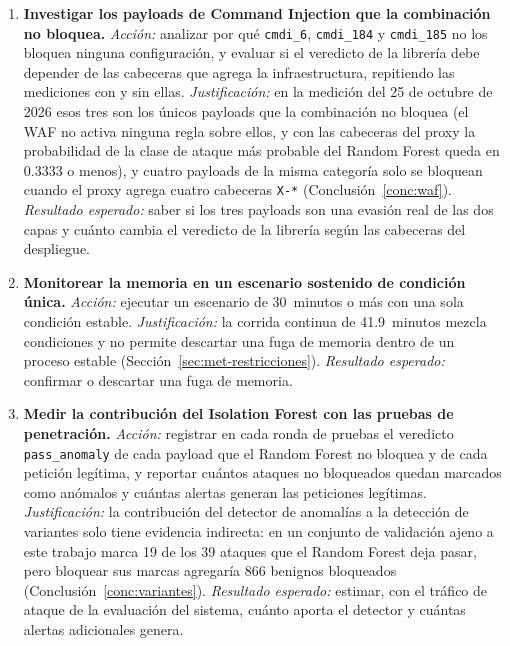 \begin{enumerate}
    \item \textbf{Investigar los payloads de Command Injection que la combinación no bloquea.}
    \textit{Acción:} analizar por qué \texttt{cmdi\_6}, \texttt{cmdi\_184} y \texttt{cmdi\_185} no
    los bloquea ninguna configuración, y evaluar si el veredicto de la librería debe depender de
    las cabeceras que agrega la infraestructura, repitiendo las mediciones con y sin ellas.
    \textit{Justificación:} en la medición del 25 de octubre de 2026 esos tres son los únicos
    payloads que la combinación no bloquea (el WAF no activa ninguna regla sobre ellos, y con las
    cabeceras del proxy la probabilidad de la clase de ataque más probable del Random Forest queda
    en 0.3333 o menos), y cuatro payloads de la misma categoría solo se bloquean cuando el proxy
    agrega cuatro cabeceras \texttt{X-*} (Conclusión~\ref{conc:waf}). \textit{Resultado esperado:}
    saber si los tres payloads son una evasión real de las dos capas y cuánto cambia el veredicto
    de la librería según las cabeceras del despliegue.

    \item \textbf{Monitorear la memoria en un escenario sostenido de condición única.}
    \textit{Acción:} ejecutar un escenario de 30~minutos o más con una sola condición estable.
    \textit{Justificación:} la corrida continua de 41.9~minutos mezcla condiciones y no permite
    descartar una fuga de memoria dentro de un proceso estable (Sección~\ref{sec:met-restricciones}).
    \textit{Resultado esperado:} confirmar o descartar una fuga de memoria.

    \item \textbf{Medir la contribución del Isolation Forest con las pruebas de penetración.}
    \textit{Acción:} registrar en cada ronda de pruebas el veredicto \texttt{pass\_anomaly} de cada
    payload que el Random Forest no bloquea y de cada petición legítima, y reportar cuántos
    ataques no bloqueados quedan marcados como anómalos y cuántas alertas generan las peticiones
    legítimas. \textit{Justificación:} la contribución del detector de anomalías a la detección de
    variantes solo tiene evidencia indirecta: en un conjunto de validación ajeno a este trabajo marca
    19 de los 39 ataques que el Random Forest deja pasar, pero bloquear sus marcas agregaría 866
    benignos bloqueados \cite{valenzuela2026ia} (Conclusión~\ref{conc:variantes}).
    \textit{Resultado esperado:} estimar, con el tráfico de ataque de la evaluación del sistema,
    cuánto aporta el detector y cuántas alertas adicionales genera.
\end{enumerate}


